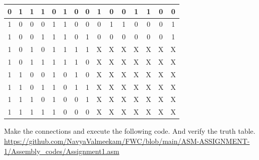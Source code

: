 \documentclass{article}
\begin{document}
\begin{multicols}{2}
\begin{center}
\begin{tableofcontents}
\begin{tabular}{|c|c|c|c|c|c|c|c|c|c|c|c|c|c|c|}
\hline 
0 & 1 & 1 & 1 & 0 & 1 & 0 & 0 & 1 & 0 & 0 & 1 & 1 & 0 & 0 \\
\hline
1 & 0 & 0 & 0 & 1 & 1 & 0 & 0 & 0 & 1 & 1 & 0 & 0 & 0 & 1 \\
\hline
1 & 0 & 0 & 1 & 1 & 1 & 0 & 1 & 0 & 0 & 0 & 0 & 0 & 0 & 1 \\
\hline
1 & 0 & 1 & 0 & 1 & 1 & 1 & 1 & {X} & {X} & {X} & {X} & {X} & {X} & {X}  \\
\hline
1 & 0 & 1 & 1 & 1 & 1 & 1 & 0 & {X} & {X} & {X} & {X} & {X} & {X} & {X}  \\
\hline
1 & 1 & 0 & 0 & 1 & 0 & 1 & 0 & {X} & {X} & {X} & {X} & {X} & {X} & {X} \\
\hline
1 & 1 & 0 & 1 & 1 & 0 & 1 & 1 & {X} & {X} & {X} & {X} & {X} & {X} & {X} \\
\hline
1 & 1 & 1 & 0 & 1 & 0 & 0 & 1 & {X} & {X} & {X} & {X} & {X} & {X} & {X} \\
\hline
1 & 1 & 1 & 1 & 1 & 0 & 0 & 0 & {X} & {X} & {X} & {X} & {X} & {X} & {X}  \\
\hline
\end{tabular}
\end{tableofcontents}
\end{center}
Make the connections and execute the following code. And verify the truth table. 
\newline
\newline
\href{https://github.com/NavyaValmeekam/FWC/blob/main/ASM-ASSIGNMENT-1/Assembly_codes/Assignment1.asm}{https://github.com/NavyaValmeekam/FWC/blob/main/ASM-ASSIGNMENT-1/Assembly_codes/Assignment1.asm}
\maketitle
\newpage
\bigskip
\renewcommand{\thefigure}{\theenumi}
\renewcommand{\thetable}{\theenumi}
%
%



\end{multicols}
\end{document}
